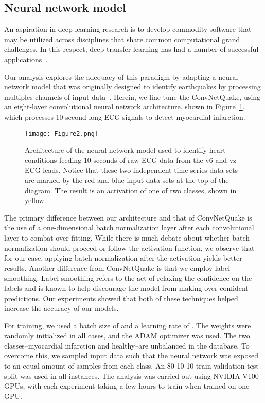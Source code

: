 \documentclass{svproc}
\begin{document}
\subsection{Neural network model}

An aspiration in deep learning research is to develop commodity software that may be utilized across disciplines that share common computational grand challenges. In this respect, deep transfer learning has had a number of successful applications~\cite{KHAN2019248,Tang:2019MNRAS,dglitcha:2017,weistarclusters,Ackerman2018MNRAS}.

Our analysis explores the adequacy of this paradigm by adapting a neural network model that was originally designed to identify earthquakes by processing multiples channels of input data~\cite{cNQ}. Herein, we fine-tune the ConvNetQuake, using an eight-layer convolutional neural network architecture, shown in Figure~\ref{fig:architecture}, which processes 10-second long ECG signals to detect myocardial infarction. 

\begin{figure}[!h]
    \centering
    \texttt{[image: Figure2.png]}
    \caption{Architecture of the neural network model used to identify heart conditions feeding 10 seconds of raw ECG data from the v6 and vz ECG leads. Notice that these two independent time-series data sets are marked by the red and blue input data sets at the top of the diagram. The result is an activation of one of two classes, shown in yellow.}
    \label{fig:architecture}
\end{figure}

The primary difference between our architecture and that of ConvNetQuake is the use of a one-dimensional batch normalization layer after each convolutional layer to combat over-fitting. While there is much debate about whether batch normalization should proceed or follow the activation function, we observe that for our case, applying batch normalization after the activation yields better results. Another difference from ConvNetQuake is that we employ label smoothing. Label smoothing refers to the act of relaxing the confidence on the labels and is known to help discourage the model from making over-confident predictions. Our experiments showed that both of these techniques helped increase the accuracy of our models.

For training, we used a batch size of  and a learning rate of . The weights were randomly initialized in all cases, and the ADAM optimizer was used. The two classes--myocardial infarction and healthy--are unbalanced in the database. To overcome this, we sampled input data such that the neural network was exposed to an equal amount of samples from each class. An 80-10-10 train-validation-test split was used in all instances. The analysis was carried out using NVIDIA V100 GPUs, with each experiment taking a few hours to train when trained on one GPU. 
\end{document}
